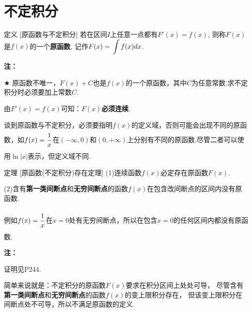 \documentclass[a4paper,12pt,oneside,fontset=none]{ctexbook}
\let\olddfrac\dfrac
\renewcommand{\dfrac}[2]{
    \olddfrac{#1\vrule width 0pt height 1.15em depth 0em}{#2\vrule width 0pt height 0em depth 0.6em}
}
\let\oldint\int
\renewcommand{\int}{\displaystyle{\vrule width 0pt height 0em depth 0em}\oldint}
\newcounter{theorem}[chapter]
\newenvironment{theorem}[1][]{\begin{thmBox}{定理}{#1}}{\end{thmBox}}
\newcounter{definition}[chapter]
\newenvironment{definition}[1][]{\begin{defBox}{定义}{#1}}{\end{defBox}}
\newenvironment{note}{
    \par\vspace{0.5em}\noindent
    \textbf{\color{NoteColor} 注：}
}{
    \par\vspace{0.5em}
}
\numberwithin{equation}{chapter}
\begin{document}
\section{不定积分}
\begin{definition}
    [原函数与不定积分]
    若在区间$I$上任意一点都有$F'(x) = f(x)$, 则称$F(x)$是$f(x)$的一个\textbf{原函数}, 记作$F(x) = \int f(x) dx$.
\end{definition}
\begin{note}
    $\bigstar$ 原函数不唯一，$F(x) + C$也是$f(x)$的一个原函数，其中$C$为任意常数.求不定积分时必须要加上常数$C$.

    由$F'(x) = f(x)$可知：\textbf{$F(x)$必须连续}.

    谈到原函数与不定积分，必须要指明$f(x)$的定义域，否则可能会出现不同的原函数，如$f(x)=\dfrac{1}{x}$在$(-\infty,0)$和$(0,+\infty)$上分别有不同的原函数.尽管二者可以使用$\ln|x|$表示，但定义域不同.
\end{note}

\begin{theorem}
    [原函数(不定积分)存在定理]
    (1)连续函数$f(x)$必定存在原函数$F(x)$.

    (2)含有\textbf{第一类间断点}和\textbf{无穷间断点}的函数$f(x)$在包含改间断点的区间内没有原函数.

    例如$f(x)=\dfrac{1}{x}$在$x=0$处有无穷间断点，所以在包含$x=0$的任何区间内都没有原函数.
\end{theorem}
\begin{note}
    证明见P244.

    简单来说就是：不定积分的原函数$F(x)$要求在积分区间上处处可导，
    尽管含有\textbf{第一类间断点}和\textbf{无穷间断点}的函数$f(x)$的变上限积分存在，
    但该变上限积分在间断点处不可导，所以不满足原函数的定义.
\end{note}
\end{document}
